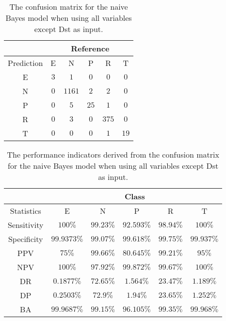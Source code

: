 \documentclass[preprint,12pt]{elsarticle}
\begin{document}
\begin{table}[!ht]
	\centering
	\begin{tabular}{|c|c|c|c|c|c|}
		\hline
		 & \multicolumn{5}{|c|}{Reference} \\ \hline
		 Prediction & E & N & P & R & T \\ \hline
		 E & $3$ & $1$ & $0$ & $0$ & $0$ \\ \hline
		 N & $0$ & $1161$ & $2$ & $2$ & $0$ \\ \hline
		 P & $0$ & $5$ & $25$ & $1$ & $0$ \\ \hline
		 R & $0$ & $3$ & $0$ & $375$ & $0$ \\ \hline
		 T & $0$ & $0$ & $0$ & $1$ & $19$ \\ \hline
	\end{tabular}
	\caption{The confusion matrix for the naive Bayes model when using all variables except Dst as input.}
	\label{tab:cm:noDst:nb}
\end{table}

\begin{table}[!ht]
	\centering
	\begin{tabular}{|c|c|c|c|c|c|}
		\hline
		 & \multicolumn{5}{c|}{Class} \\ \hline
		Statistics & E & N & P & R & T \\ \hline
		Sensitivity & $100\%$ & $99.23\%$ & $92.593\%$ & $98.94\%$ & $100\%$ \\ \hline
		Specificity & $99.9373\%$ & $99.07\%$ & $99.618\%$ & $99.75\%$ & $99.937\%$ \\ \hline
		PPV & $75\%$ & $99.66\%$ & $80.645\%$ & $99.21\%$ & $95\%$ \\ \hline
		NPV & $100\%$ & $97.92\%$ & $99.872\%$ & $99.67\%$ & $100\%$ \\ \hline
		DR & $0.1877\%$ & $72.65\%$ & $1.564\%$ & $23.47\%$ & $1.189\%$ \\ \hline
		DP & $0.2503\%$ & $72.9\%$ & $1.94\%$ & $23.65\%$ & $1.252\%$ \\ \hline
		BA & $99.9687\%$ & $99.15\%$ & $96.105\%$ & $99.35\%$ & $99.968\%$ \\ \hline
	\end{tabular}
	\caption{The performance indicators derived from the confusion matrix for the naive Bayes model when using all variables except Dst as input.}
	\label{tab:cs:reverse:noDst:nb}
\end{table}
\end{document}
